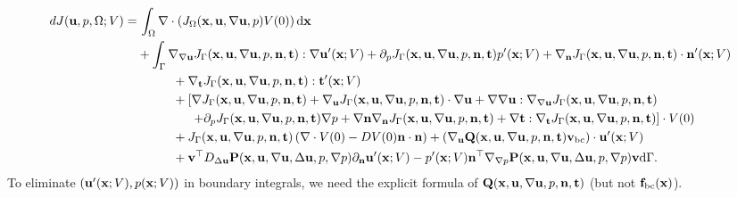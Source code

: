 \documentclass[oneside]{book}
\numberwithin{equation}{section}
\begin{document}
\begin{enumerate}[leftmargin=0in]
    \begin{align*}
        dJ({\bf u},p,\Omega;V) =&\, \int_\Omega \nabla\cdot\left(J_\Omega({\bf x},{\bf u},\nabla{\bf u},p)V(0)\right){\rm d}{\bf x}\\
        &+ \int_\Gamma \nabla_{\nabla{\bf u}}J_\Gamma({\bf x},{\bf u},\nabla{\bf u},p,{\bf n},{\bf t}):\nabla{\bf u}'({\bf x};V) + \partial_pJ_\Gamma({\bf x},{\bf u},\nabla{\bf u},p,{\bf n},{\bf t})p'({\bf x};V) + \nabla_{\bf n}J_\Gamma({\bf x},{\bf u},\nabla{\bf u},p,{\bf n},{\bf t})\cdot{\bf n}'({\bf x};V)\\
        &\hspace{1cm}+ \nabla_{\bf t}J_\Gamma({\bf x},{\bf u},\nabla{\bf u},p,{\bf n},{\bf t}):{\bf t}'({\bf x};V)\\
        &\hspace{1cm}+ \left[\nabla J_\Gamma({\bf x},{\bf u},\nabla{\bf u},p,{\bf n},{\bf t}) + \nabla_{\bf u}J_\Gamma({\bf x},{\bf u},\nabla{\bf u},p,{\bf n},{\bf t})\cdot\nabla{\bf u} + \nabla\nabla{\bf u}:\nabla_{\nabla{\bf u}}J_\Gamma({\bf x},{\bf u},\nabla{\bf u},p,{\bf n},{\bf t})\right.\\
        &\hspace{15mm} \left.+ \partial_pJ_\Gamma({\bf x},{\bf u},\nabla{\bf u},p,{\bf n},{\bf t})\nabla p + \nabla{\bf n}\nabla_{\bf n}J_\Gamma({\bf x},{\bf u},\nabla{\bf u},p,{\bf n},{\bf t}) + \nabla{\bf t}:\nabla_{\bf t}J_\Gamma({\bf x},{\bf u},\nabla{\bf u},p,{\bf n},{\bf t})\right]\cdot V(0)\\
        &\hspace{1cm}+ J_\Gamma({\bf x},{\bf u},\nabla{\bf u},p,{\bf n},{\bf t})\left(\nabla\cdot V(0) - DV(0){\bf n}\cdot{\bf n}\right) + \left(\nabla_{\bf u}{\bf Q}({\bf x},{\bf u},\nabla{\bf u},p,{\bf n},{\bf t}){\bf v}_{\rm bc}\right)\cdot{\bf u}'({\bf x};V)\\
        &\hspace{1cm}+ {\bf v}^\top D_{\Delta{\bf u}}{\bf P}({\bf x},{\bf u},\nabla{\bf u},\Delta{\bf u},p,\nabla p)\partial_{\bf n}{\bf u}'({\bf x};V) - p'({\bf x};V){\bf n}^\top\nabla_{\nabla p}{\bf P}({\bf x},{\bf u},\nabla{\bf u},\Delta{\bf u},p,\nabla p){\bf v}{\rm d}\Gamma.
    \end{align*}
    To eliminate $({\bf u}'({\bf x};V),p({\bf x};V))$ in boundary integrals, we need the explicit formula of ${\bf Q}({\bf x},{\bf u},\nabla{\bf u},p,{\bf n},{\bf t})$ (but not ${\bf f}_{\rm bc}({\bf x})$).
    

\end{enumerate}
\end{document}
